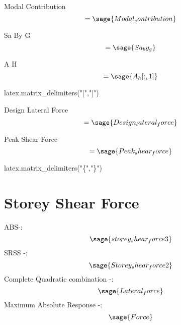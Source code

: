 \documentclass[12pt]{report}
\begin{document}
Modal Contribution
\begin{equation}
	[M_{{c}}]=\sage{Modal_contribution}
\end{equation}


Sa By G
\begin{equation}
	 [S_{{a}}]=\sage{Sa_by_g}
\end{equation}

A H
\begin{equation}
	[A_{{H}}]=\sage{A_h[:,1]}
\end{equation}

\begin{sagesilent}
latex.matrix_delimiters("[","]")

\end{sagesilent}
Design Lateral Force
\begin{equation}
	[F]=\sage{Design_lateral_force}
\end{equation}

Peak Shear Force
\begin{equation}
	[V]=\sage{Peak_shear_force}
\end{equation}


\begin{sagesilent}
latex.matrix_delimiters("\{","\}")
\end{sagesilent}

\section{Storey Shear Force}
ABS-:
\begin{equation}
	\sage{storey_shear_force3}
\end{equation}
SRSS -:
\begin{equation}
	\sage{Storey_shear_force2}
\end{equation}
Complete Quadratic combination -:
\begin{equation}
	\sage{Lateral_force}
\end{equation}
Maximum Absolute Response -:
\begin{equation}
	\sage{Force}
\end{equation}
\end{document}
